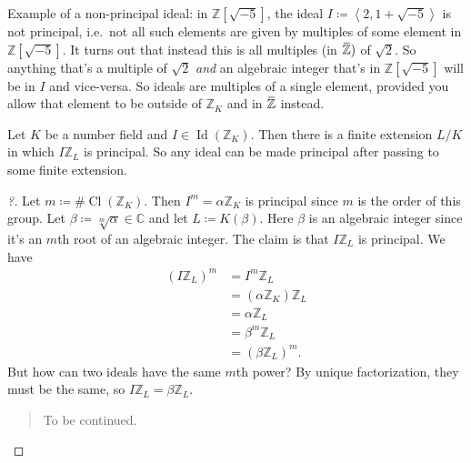 \begin{remark}

Example of a non-principal ideal: in \({\mathbb{Z}}[\sqrt{-5}]\), the
ideal \(I \coloneqq\left\langle{ 2, 1 + \sqrt{-5} }\right\rangle\) is
not principal, i.e.~not all such elements are given by multiples of some
element in \({\mathbb{Z}}[ \sqrt{-5} ]\). It turns out that instead this
is all multiples (in
\(\mkern 1.5mu\overline{\mkern-1.5mu{\mathbb{Z}}\mkern-1.5mu}\mkern 1.5mu)\)
of \(\sqrt{2}\). So anything that's a multiple of \(\sqrt{2}\)
\emph{and} an algebraic integer that's in \({\mathbb{Z}}[\sqrt{-5}]\)
will be in \(I\) and vice-versa. So ideals are multiples of a single
element, provided you allow that element to be outside of
\({\mathbb{Z}}_K\) and in
\(\mkern 1.5mu\overline{\mkern-1.5mu{\mathbb{Z}}\mkern-1.5mu}\mkern 1.5mu\)
instead.

\end{remark}

\begin{lemma}[?]

Let \(K\) be a number field and
\(I\in \operatorname{Id}({\mathbb{Z}}_K)\). Then there is a finite
extension \(L/K\) in which \(I{\mathbb{Z}}_L\) is principal. So any
ideal can be made principal after passing to some finite extension.

\end{lemma}

\begin{proof}[?]

Let \(m \coloneqq\# \operatorname{Cl}({\mathbb{Z}}_K)\). Then
\(I^m = \alpha{\mathbb{Z}}_K\) is principal since \(m\) is the order of
this group. Let \(\beta\coloneqq\sqrt[m]{\alpha} \in {\mathbb{C}}\) and
let \(L \coloneqq K( \beta)\). Here \(\beta\) is an algebraic integer
since it's an \(m\)th root of an algebraic integer. The claim is that
\(I{\mathbb{Z}}_L\) is principal. We have
\begin{align*}
(I {\mathbb{Z}}_L)^m
&= I^m {\mathbb{Z}}_L \\
&= ( \alpha{\mathbb{Z}}_K) {\mathbb{Z}}_L \\
&= \alpha{\mathbb{Z}}_L \\
&= \beta^m {\mathbb{Z}}_L \\
&= (\beta {\mathbb{Z}}_L)^m
.\end{align*}
But how can two ideals have the same \(m\)th power? By unique
factorization, they must be the same, so
\(I{\mathbb{Z}}_L = \beta {\mathbb{Z}}_L\).

\begin{quote}
To be continued.
\end{quote}

\end{proof}

